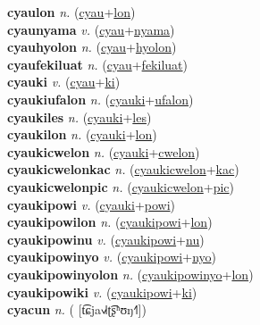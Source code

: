 \textbf{cyaulon} \textit{n.} (\hyperref[cyau]{cyau}+\hyperref[lon]{lon})
 \label{cyaulon} \\
\textbf{cyaunyama} \textit{v.} (\hyperref[cyau]{cyau}+\hyperref[nyama]{nyama})
 \label{cyaunyama} \\
\textbf{cyauhyolon} \textit{n.} (\hyperref[cyau]{cyau}+\hyperref[hyolon]{hyolon})
 \label{cyauhyolon} \\
\textbf{cyaufekiluat} \textit{n.} (\hyperref[cyau]{cyau}+\hyperref[fekiluat]{fekiluat})
 \label{cyaufekiluat} \\
\textbf{cyauki} \textit{v.} (\hyperref[cyau]{cyau}+\hyperref[ki]{ki})
 \label{cyauki} \\
\textbf{cyaukiufalon} \textit{n.} (\hyperref[cyauki]{cyauki}+\hyperref[ufalon]{ufalon})
 \label{cyaukiufalon} \\
\textbf{cyaukiles} \textit{n.} (\hyperref[cyauki]{cyauki}+\hyperref[les]{les})
 \label{cyaukiles} \\
\textbf{cyaukilon} \textit{n.} (\hyperref[cyauki]{cyauki}+\hyperref[lon]{lon})
 \label{cyaukilon} \\
\textbf{cyaukicwelon} \textit{n.} (\hyperref[cyauki]{cyauki}+\hyperref[cwelon]{cwelon})
 \label{cyaukicwelon} \\
\textbf{cyaukicwelonkac} \textit{n.} (\hyperref[cyaukicwelon]{cyaukicwelon}+\hyperref[kac]{kac})
 \label{cyaukicwelonkac} \\
\textbf{cyaukicwelonpic} \textit{n.} (\hyperref[cyaukicwelon]{cyaukicwelon}+\hyperref[pic]{pic})
 \label{cyaukicwelonpic} \\
\textbf{cyaukipowi} \textit{v.} (\hyperref[cyauki]{cyauki}+\hyperref[powi]{powi})
 \label{cyaukipowi} \\
\textbf{cyaukipowilon} \textit{n.} (\hyperref[cyaukipowi]{cyaukipowi}+\hyperref[lon]{lon})
 \label{cyaukipowilon} \\
\textbf{cyaukipowinu} \textit{v.} (\hyperref[cyaukipowi]{cyaukipowi}+\hyperref[nu]{nu})
 \label{cyaukipowinu} \\
\textbf{cyaukipowinyo} \textit{v.} (\hyperref[cyaukipowi]{cyaukipowi}+\hyperref[nyo]{nyo})
 \label{cyaukipowinyo} \\
\textbf{cyaukipowinyolon} \textit{n.} (\hyperref[cyaukipowinyo]{cyaukipowinyo}+\hyperref[lon]{lon})
 \label{cyaukipowinyolon} \\
\textbf{cyaukipowiki} \textit{v.} (\hyperref[cyaukipowi]{cyaukipowi}+\hyperref[ki]{ki})
 \label{cyaukipowiki} \\
\textbf{cyacun} \textit{n.} ( [t͡ɕja˧˩˧ʈ͡ʂʰʊŋ˧˥])
